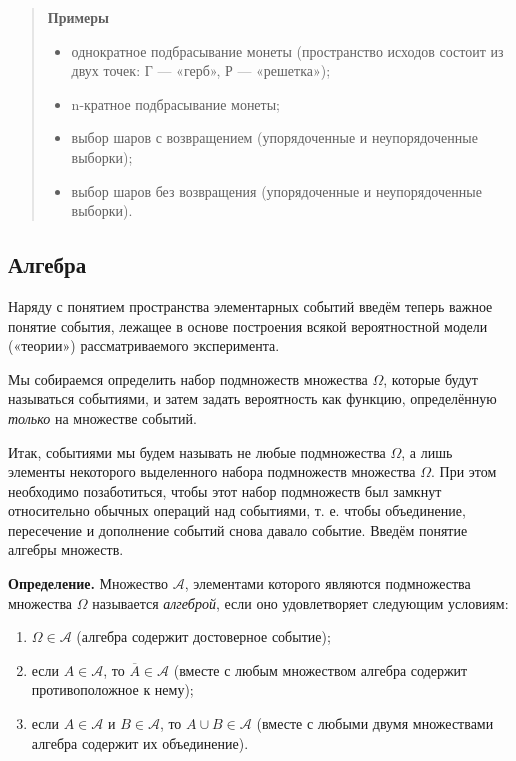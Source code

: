 \documentclass[11pt,a4paper]{article}
\providecommand{\tightlist}{%
      \setlength{\itemsep}{0pt}\setlength{\parskip}{0pt}}
\begin{document}
    \begin{quote}
\textbf{Примеры}

\begin{itemize}
\tightlist
\item
  однократное подбрасывание монеты (пространство исходов состоит из двух
  точек: Г --- «герб», Р --- «решетка»);
\item
  n-кратное подбрасывание монеты;
\item
  выбор шаров с возвращением (упорядоченные и неупорядоченные выборки);
\item
  выбор шаров без возвращения (упорядоченные и неупорядоченные
  выборки).
\end{itemize}
\end{quote}

    \hypertarget{ux430ux43bux433ux435ux431ux440ux430}{%
\subsection{Алгебра}\label{ux430ux43bux433ux435ux431ux440ux430}}

Наряду с понятием пространства элементарных событий введём теперь важное
понятие события, лежащее в основе построения всякой вероятностной модели
(«теории») рассматриваемого эксперимента.

Мы собираемся определить набор подмножеств множества \(\Omega\), которые
будут называться событиями, и затем задать вероятность как функцию,
определённую \emph{только} на множестве событий.

Итак, событиями мы будем называть не любые подмножества \(\Omega\), а
лишь элементы некоторого выделенного набора подмножеств множества
\(\Omega\). При этом необходимо позаботиться, чтобы этот набор
подмножеств был замкнут относительно обычных операций над событиями, т.
е. чтобы объединение, пересечение и дополнение событий снова давало
событие. Введём понятие алгебры множеств.

\textbf{Определение.} Множество \(\mathcal{A}\), элементами которого
являются подмножества множества \(\Omega\) называется \emph{алгеброй},
если оно удовлетворяет следующим условиям:

\begin{enumerate}
\def\labelenumi{\arabic{enumi}.}
\tightlist
\item
  \(\Omega \in \mathcal{A}\) (алгебра содержит достоверное событие);
\item
  если \(A \in \mathcal{A}\), то \(\overline{A} \in \mathcal{A}\)
  (вместе с любым множеством алгебра содержит противоположное к нему);
\item
  если \(A \in \mathcal{A}\) и \(B \in \mathcal{A}\), то
  \(A \cup B \in \mathcal{A}\) (вместе с любыми двумя множествами
  алгебра содержит их объединение).
\end{enumerate}
\end{document}
